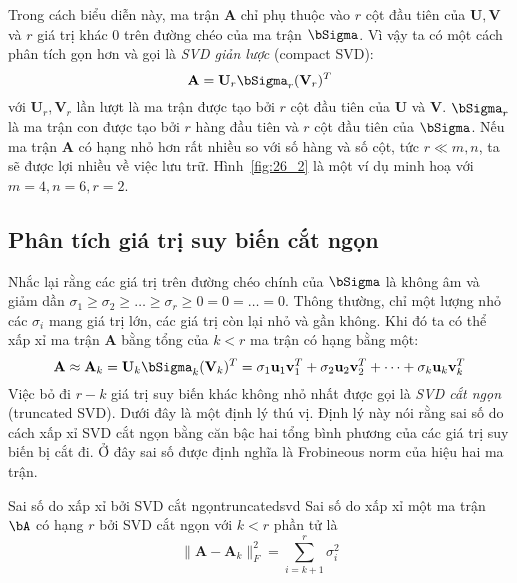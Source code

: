 Trong cách biểu diễn này, ma trận $\mathbf{A}$ chỉ phụ thuộc vào $r$ cột
đầu tiên của $\mathbf{U, V}$ và $r$ giá trị khác 0 trên đường chéo của ma trận
$\bSigma$. Vì vậy ta có một cách phân tích {gọn} hơn và gọi là \textit{SVD giản lược} (compact SVD):
\begin{equation}
\mathbf{A} = {\mathbf{U}}_r{\bSigma}_r({\mathbf{V}}_r)^T
\end{equation}
với $\mathbf{U}_r, \mathbf{V}_r $ lần lượt là ma trận được tạo bởi $r$ cột đầu
tiên của $\mathbf{U}$ và $\mathbf{V}$. $\bSigma_r$ là ma trận con được tạo bởi
$r$ hàng đầu tiên và $r$ cột đầu tiên của $\bSigma$. Nếu ma trận $\mathbf{A}$ có
hạng nhỏ hơn rất nhiều so với số hàng và số cột, tức $r \ll m, n$, ta sẽ được lợi
nhiều về việc lưu trữ. Hình~\ref{fig:26_2} là một ví dụ minh hoạ với $m = 4, n = 6, r = 2$.


\subsection{Phân tích giá trị suy biến cắt ngọn}
Nhắc lại rằng các giá trị trên đường chéo chính của $\bSigma$ là không âm
và giảm dần $\sigma_1 \geq \sigma_2 \geq \dots \geq \sigma_r \geq 0 = 0 = \dots
= 0$. Thông thường, chỉ một lượng nhỏ các $\sigma_i$ mang giá trị lớn, các giá
trị còn lại nhỏ và gần không. Khi đó ta có thể xấp xỉ ma trận $\mathbf{A}$
bằng tổng của $k < r$ ma trận có hạng bằng một:
\begin{equation}
\mathbf{A} \approx \mathbf{A}_k = \mathbf{U}_k \bSigma_k (\mathbf{V}_k)^T = \sigma_1 \mathbf{u}_1 \mathbf{v}^T_1 + \sigma_2\mathbf{u}_2\mathbf{v}_2^T + \dots + \sigma_k\mathbf{u}_k\mathbf{v}_k^T
\end{equation}
Việc bỏ đi $r-k$ giá trị suy biến khác không nhỏ nhất được gọi là \textit{SVD cắt ngọn} (truncated SVD). Dưới đây là một định lý thú vị. Định lý này nói rằng sai số do cách xấp xỉ SVD cắt ngọn bằng căn bậc hai tổng bình phương của các giá trị suy biến bị cắt đi. Ở đây sai số được định nghĩa là Frobineous norm của
hiệu hai ma trận.
\begin{mytheo}{Sai số do xấp xỉ bởi SVD cắt ngọn}{truncatedsvd}
Sai số do xấp xỉ một ma trận $\bA$ có hạng $r$ bởi SVD cắt ngọn với $k < r$ phần tử là
\begin{equation}
\|\mathbf{A} - \mathbf{A}_k\|_F^2 = \sum_{i = k + 1}^r \sigma_i^2
\end{equation}
\end{mytheo}

